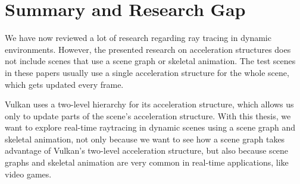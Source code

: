 \section{Summary and Research Gap}

We have now reviewed a lot of research regarding ray tracing in dynamic environments. However, the presented research on acceleration structures does not include scenes that use a scene graph or skeletal animation. The test scenes in these papers usually use a single acceleration structure for the whole scene, which gets updated every frame.

Vulkan uses a two-level hierarchy for its acceleration structure, which allows us only to update parts of the scene's acceleration structure. With this thesis, we want to explore real-time raytracing in dynamic scenes using a scene graph and skeletal animation, not only because we want to see how a scene graph takes advantage of Vulkan's two-level acceleration structure, but also because scene graphs and skeletal animation are very common in real-time applications, like video games.